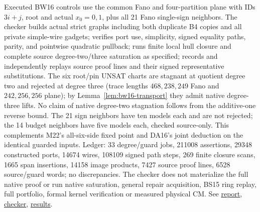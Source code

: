 \documentclass[11pt]{article}
\begin{document}
Executed BW16 controls use the common Fano and four-partition plane with IDs $3i+j$, root and actual $x_0=0,1$, plus all 21 Fano single-sign neighbors. The checker builds actual strict graphs including both duplicate B4 copies and all private simple-wire gadgets; verifies port use, simplicity, signed equality paths, parity, and pointwise quadratic pullback; runs finite local hull closure and complete source degree-two/three saturation as specified; records and independently replays source proof lines and their signed representative substitutions. The six root/pin UNSAT charts are stagnant at quotient degree two and rejected at degree three (trace lengths $468,238,249$ Fano and $242,256,256$ plane); by Lemma~\ref{lem:bw16-transport} they admit native degree-three lifts. No claim of native degree-two stagnation follows from the additive-one reverse bound. The 21 sign neighbors have ten models each and are not rejected; the 14 budget neighbors have five models each, checked source-only. This complements M22's all-six-side fixed point and DA16's joint deduction on the identical guarded inputs. Ledger: 33 degree/guard jobs, 211008 assertions, 29348 constructed ports, 14674 wires, 108109 signed path steps, 269 finite closure scans, 1665 span insertions, 14158 image products, 7427 source proof lines, 6528 source/guard words; no discrepancies. The checker does not materialize the full native proof or run native saturation, general repair acquisition, BS15 ring replay, full portfolio, formal kernel verification or measured physical CM. See \href{https://github.com/j15marti/pnp/commit/828faea2d784657c7722bc847e2dac37b3d52548}{report}, \href{https://github.com/j15marti/pnp/commit/92da2a01049b5a91b0d64dbc120ce0c4555bf1a5}{checker}, \href{https://github.com/j15marti/pnp/commit/5bd8415170a1df76c1cbc19828af5e22700b7ce5}{results}.
\end{document}
